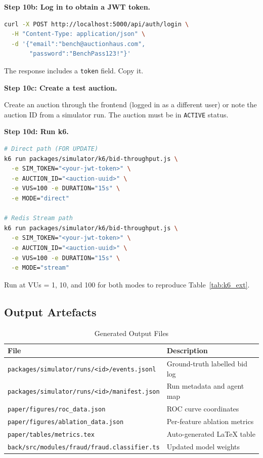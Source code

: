 \documentclass[11pt]{article}
\begin{document}
\textbf{Step 10b: Log in to obtain a JWT token.}
\begin{lstlisting}[language=bash]
curl -X POST http://localhost:5000/api/auth/login \
  -H "Content-Type: application/json" \
  -d '{"email":"bench@auctionhaus.com",
       "password":"BenchPass123!"}'
\end{lstlisting}
The response includes a \texttt{token} field. Copy it.

\textbf{Step 10c: Create a test auction.}

Create an auction through the frontend (logged in as a different user)
or note the auction ID from a simulator run. The auction must be in
\texttt{ACTIVE} status.

\textbf{Step 10d: Run k6.}
\begin{lstlisting}[language=bash]
# Direct path (FOR UPDATE)
k6 run packages/simulator/k6/bid-throughput.js \
  -e SIM_TOKEN="<your-jwt-token>" \
  -e AUCTION_ID="<auction-uuid>" \
  -e VUS=100 -e DURATION="15s" \
  -e MODE="direct"

# Redis Stream path
k6 run packages/simulator/k6/bid-throughput.js \
  -e SIM_TOKEN="<your-jwt-token>" \
  -e AUCTION_ID="<auction-uuid>" \
  -e VUS=100 -e DURATION="15s" \
  -e MODE="stream"
\end{lstlisting}

Run at VUs = 1, 10, and 100 for both modes to reproduce
Table~\ref{tab:k6_ext}.

\subsection{Output Artefacts}

\begin{table}[ht]
\centering
\caption{Generated Output Files}
\label{tab:outputs}
\begin{tabular}{ll}
\toprule
\textbf{File} & \textbf{Description} \\
\midrule
\texttt{packages/simulator/runs/<id>/events.jsonl} & Ground-truth labelled bid log \\
\texttt{packages/simulator/runs/<id>/manifest.json} & Run metadata and agent map \\
\texttt{paper/figures/roc\_data.json} & ROC curve coordinates \\
\texttt{paper/figures/ablation\_data.json} & Per-feature ablation metrics \\
\texttt{paper/tables/metrics.tex} & Auto-generated LaTeX table \\
\texttt{back/src/modules/fraud/fraud.classifier.ts} & Updated model weights \\
\bottomrule
\end{tabular}
\end{table}
\end{document}
